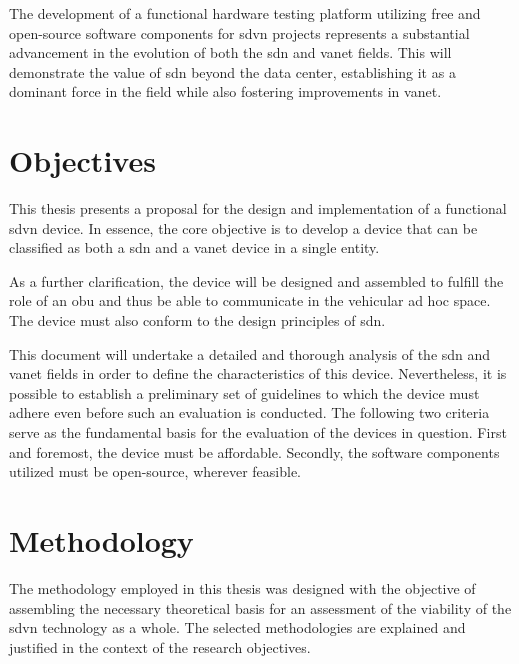 The development of a functional hardware testing platform utilizing free and open-source software components for \gls{sdvn} projects represents a substantial advancement in the evolution of both the \gls{sdn} and \gls{vanet} fields. This will demonstrate the value of \gls{sdn} beyond the data center, establishing it as a dominant force in the field while also fostering improvements in \gls{vanet}.


\section{Objectives} %
\label{sec:objectives}

This thesis presents a proposal for the design and implementation of a functional \gls{sdvn} device. In essence, the core objective is to develop a device that can be classified as both a \gls{sdn} and a \gls{vanet} device in a single entity. 

As a further clarification, the device will be designed and assembled to fulfill the role of an \gls{obu} and thus be able to communicate in the  vehicular ad hoc space. The device must also conform to the design principles of \gls{sdn}.

This document will undertake a detailed and thorough analysis of the \gls{sdn} and \gls{vanet} fields in order to define the characteristics of this device. Nevertheless, it is possible to establish a preliminary set of guidelines to which the device must adhere even before such an evaluation is conducted. The following two criteria serve as the fundamental basis for the evaluation of the devices in question. First and foremost, the device must be affordable. Secondly, the software components utilized must be open-source, wherever feasible.


\section{Methodology} %
\label{sec:methodology}

The methodology employed in this thesis was designed with the objective of assembling the necessary theoretical basis for an assessment of the viability of the \gls{sdvn} technology as a whole. The selected methodologies are explained and justified in the context of the research objectives.

